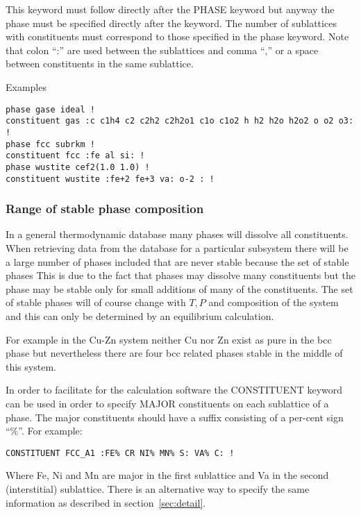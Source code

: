 \documentclass[12pt]{article}
\begin{document}
This keyword must follow directly after the PHASE keyword but anyway
the phase must be specified directly after the keyword.  The number of
sublattices with constituents must correspond to those specified in
the phase keyword.  Note that colon ``:'' are used between the
sublattices and comma ``,'' or a space between constituents in the
same sublattice.

Examples

\begin{verbatim}
phase gase ideal !
constituent gas :c c1h4 c2 c2h2 c2h2o1 c1o c1o2 h h2 h2o h2o2 o o2 o3: !
phase fcc subrkm !
constituent fcc :fe al si: !
phase wustite cef2(1.0 1.0) !
constituent wustite :fe+2 fe+3 va: o-2 : !
\end{verbatim}

\subsubsection{Range of stable phase composition}\label{sec:phaserange}

In a general thermodynamic database many phases will dissolve all
constituents.  When retrieving data from the database for a particular
subsystem there will be a large number of phases included that are
never stable because the set of stable phases This is due to the fact
that phases may dissolve many constituents but the phase may be stable
only for small additions of many of the constituents.  The set of
stable phases will of course change with $T, P$ and composition of the
system and this can only be determined by an equilibrium calculation.

For example in the Cu-Zn system neither Cu nor Zn exist as pure in the
bcc phase but nevertheless there are four bcc related phases stable in
the middle of this system.

In order to facilitate for the calculation software the CONSTITUENT
keyword can be used in order to specify MAJOR constituents on each
sublattice of a phase.  The major constituents should have a suffix
consisting of a per-cent sign ``\%''.  For example:

\begin{verbatim}
CONSTITUENT FCC_A1 :FE% CR NI% MN% S: VA% C: !
\end{verbatim}

Where Fe, Ni and Mn are major in the first sublattice and Va in the
second (interstitial) sublattice.  There is an alternative way to
specify the same information as described in section~\ref{sec:detail}.
\end{document}
